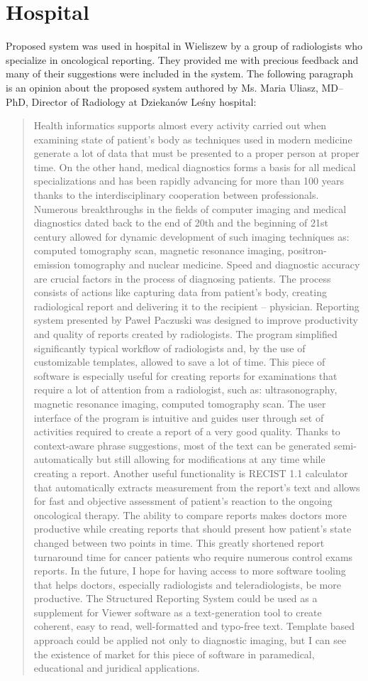 \documentclass[12pt, twoside, openany]{report}
\theoremstyle{definition}
\begin{document}
\section{Hospital}
Proposed system was used in hospital in Wieliszew by a group of radiologists who specialize in oncological reporting. They provided me with precious feedback and many of their suggestions were included in the system. 
The following paragraph is an opinion about the proposed system authored by Ms. Maria Uliasz, MD–PhD, Director of Radiology at Dziekanów Leśny hospital:
\blockquote{
Health informatics supports almost every activity carried out when examining state of patient’s body as techniques used in modern medicine generate a lot of data that must be presented to a proper person at proper time.
On the other hand, medical diagnostics forms a basis for all medical specializations and has been rapidly advancing for more than 100 years thanks to the interdisciplinary cooperation between professionals. Numerous breakthroughs in the fields of computer imaging and medical diagnostics dated back to the end of 20th and the beginning of 21st century allowed for dynamic development of such imaging techniques as: computed tomography scan, magnetic resonance imaging, positron-emission tomography and nuclear medicine. 
Speed and diagnostic accuracy are crucial factors in the process of diagnosing patients. The process consists of actions like capturing data from patient’s body, creating radiological report and delivering it to the recipient – physician.
Reporting system presented by Paweł Paczuski was designed to improve productivity and quality of reports created by radiologists. The program simplified significantly typical workflow of radiologists and, by the use of customizable templates, allowed to save a lot of time. This piece of software is especially useful for creating reports for examinations that require a lot of attention from a radiologist, such as: ultrasonography, magnetic resonance imaging, computed tomography scan. 
The user interface of the program is intuitive and guides user through set of activities required to create a report of a very good quality. Thanks to context-aware phrase suggestions, most of the text can be generated semi-automatically but still allowing for modifications at any time while creating a report. Another useful functionality is RECIST 1.1 calculator that automatically extracts measurement from the report’s text and allows for fast and objective assessment of patient’s reaction to the ongoing oncological therapy. The ability to compare reports makes doctors more productive while creating reports that should present how patient’s state changed between two points in time. This greatly shortened report turnaround time for cancer patients who require numerous control exams reports. In the future, I hope for having access to more software tooling that helps doctors, especially radiologists and teleradiologists, be more productive.
The Structured Reporting System could be used as a supplement for Viewer software as a text-generation tool to create coherent, easy to read, well-formatted and typo-free text. Template based approach could be applied not only to diagnostic imaging, but I can see the existence of market for this piece of software in paramedical, educational and juridical applications.}
\end{document}
